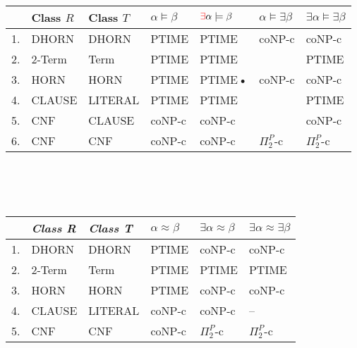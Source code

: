 \documentclass[12pt]{article}
\begin{document}
\noindent\begin{tabular}{|l|l|l|l|l|l|l|}
\hline
 & Class $R$        & Class $T$      & $\alpha \models \beta$    & $\color{red}\exists\color{black}\alpha \models  \beta$ & \color{red}$\alpha\models \exists\beta$\color{black}  &$\exists \alpha \models \exists \beta$ \\ \hline
1. & DHORN          & DHORN          & PTIME           & \color{red} PTIME\color{black}   &  \color{red} coNP-c\color{black}           &  coNP-c    \\ \hline
2. & 2-Term         & Term           & PTIME           & PTIME  &             &  PTIME     \\ \hline
3. & HORN           & HORN           & PTIME           & \color{red} PTIME\color{black}\textbf{•}    &     \color{red} coNP-c\color{black}       &  coNP-c    \\ \hline
4. & CLAUSE         & LITERAL        & PTIME           & PTIME  &             &  PTIME     \\ \hline
5. & CNF            & CLAUSE         & coNP-c          & coNP-c  &            &  coNP-c    \\ \hline
6. & CNF            & CNF            & coNP-c            & \color{red} coNP-c\color{black}   &  \color{red} $\Pi_2^P$-c \color{black}         &  \color{red} $\Pi_2^P$-c \color{black}     \\ \hline
\end{tabular}


\ \ \\  \ \\ \


\begin{tabular}{|l|l|l|l|l|l|}
\hline
 & {\em Class R} &  {\em Class T} & $\alpha \approx \beta$ & $\exists \alpha \approx \beta$ & 
$\exists \alpha \approx \exists \beta$  \\ \hline
1. & DHORN   & DHORN   & PTIME  & \color{red} coNP-c\color{black}   & coNP-c   \\ \hline
2. & 2-Term  & Term    & PTIME  & PTIME  & PTIME    \\ \hline
3. & HORN    & HORN    & PTIME  & \color{red} coNP-c\color{black}   & coNP-c   \\ \hline
4. & CLAUSE  & LITERAL & coNP-c & coNP-c & --       \\ \hline
5. & CNF     & CNF     & coNP-c & \color{red} $\Pi_2^P$-c \color{black}   & \color{red} $\Pi_2^P$-c \color{black}     \\ \hline

\end{tabular}
\end{document}
